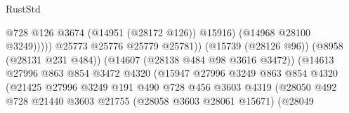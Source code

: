 \begin{lexlean}{RustStd}
\begin{coremodule}
                                                              @728
                                                              @126
                                                              @3674
                                                              (@14951 (@28172 @126))
                                                              @15916)
                                                            (@14968 @28100 @3249)))))
                                                    @25773
                                                    @25776
                                                    @25779
                                                    @25781))
                                                (@15739 (@28126 @96))
                                                (@8958 (@28131 @231 @484))
                                                (@14607 (@28138 @484 @98 @3616 @3472))
                                                (@14613
                                                  @27996
                                                  @863
                                                  @854
                                                  @3472
                                                  @4320
                                                  (@15947
                                                    @27996
                                                    @3249
                                                    @863
                                                    @854
                                                    @4320
                                                    (@21425
                                                      @27996
                                                      @3249
                                                      @191
                                                      @490
                                                      @728
                                                      @456
                                                      @3603
                                                      @4319
                                                      (@28050
                                                        @492
                                                        @728
                                                        @21440
                                                        @3603
                                                        @21755
                                                        (@28058 @3603 @28061 @15671)
                                                        (@28049

\end{coremodule}
\end{lexlean}

